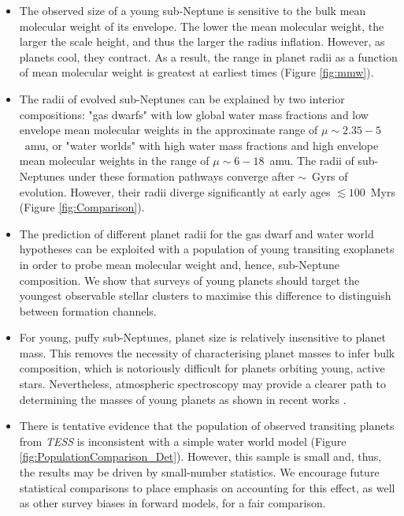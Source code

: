 \documentclass[fleqn,usenatbib]{mnras}
\begin{document}
\begin{itemize}
    \item The observed size of a young sub-Neptune is sensitive to the bulk mean molecular weight of its envelope. The lower the mean molecular weight, the larger the scale height, and thus the larger the radius inflation. However, as planets cool, they contract. As a result, the range in planet radii as a function of mean molecular weight is greatest at earliest times (Figure \ref{fig:mmw}).
    \vspace{0.2cm}
    \item The radii of evolved sub-Neptunes can be explained by two interior compositions: "gas dwarfs" with low global water mass fractions and low envelope mean molecular weights in the approximate range of $\mu \sim 2.35-5$~amu, or "water worlds" with high water mass fractions and high envelope mean molecular weights in the range of $\mu \sim 6 - 18$~amu. The radii of sub-Neptunes under these formation pathways converge after $\sim$~Gyrs of evolution. However, their radii diverge significantly at early ages $\lesssim 100$~Myrs (Figure \ref{fig:Comparison}).
    \vspace{0.2cm}
    \item The prediction of different planet radii for the gas dwarf and water world hypotheses can be exploited with a population of young transiting exoplanets in order to probe mean molecular weight and, hence, sub-Neptune composition. We show that surveys of young planets should target the youngest observable stellar clusters to maximise this difference to distinguish between formation channels.
    \vspace{0.2cm}
    \item For young, puffy sub-Neptunes, planet size is relatively insensitive to planet mass. This removes the necessity of characterising planet masses to infer bulk composition, which is notoriously difficult for planets orbiting young, active stars. Nevertheless, atmospheric spectroscopy may provide a clearer path to determining the masses of young planets as shown in recent works \citep[e.g.][]{Thao2024}.
    \vspace{0.2cm}
    \item There is tentative evidence that the population of observed transiting planets from \textit{TESS} \citep{Vach2024a} is inconsistent with a simple water world model (Figure \ref{fig:PopulationComparison_Det}). However, this sample is small and, thus, the results may be driven by small-number statistics. We encourage future statistical comparisons to place emphasis on accounting for this effect, as well as other survey biases in forward models, for a fair comparison.   
\end{itemize}
\end{document}

